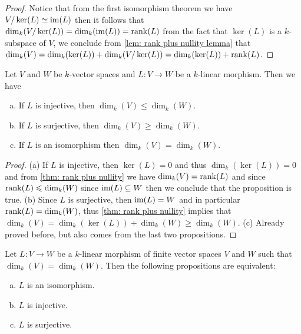 \begin{proof}
    Notice that from the first isomorphism theorem we have \(V/\ker(L) \simeq
    \operatorname{im}(L)\) then it follows that \(\dim_k(V/\ker(L)) = \dim_k(\operatorname{im}(L)) =
    \operatorname{rank}(L)\) from the fact that \(\ker(L)\) is a \(k\)-subspace of \(V\), we
    conclude from \cref{lem: rank plus nullity lemma} that \(\dim_k(V) =
    \dim_k(\ker(L)) + \dim_k(V/\ker(L)) = \dim_k(\ker(L)) + \operatorname{rank}(L)\).
\end{proof}

\begin{corollary}
    Let \(V\) and \(W\) be \(k\)-vector spaces and \(L : V \to W\) be a
    \(k\)-linear morphism. Then we have
    \begin{enumerate}[(a).]
        \item If \(L\) is injective, then \(\dim_k(V) \leq \dim_k(W)\).
        \item If \(L\) is surjective, then \(\dim_k(V) \geq \dim_k(W)\).
        \item If \(L\) is an isomorphism then \(\dim_k(V) = \dim_k(W)\).
    \end{enumerate}
\end{corollary}

\begin{proof}
    (a) If \(L\) is injective, then \(\ker(L) = 0\) and thus \(\dim_k(\ker(L)) =
    0\) and from \cref{thm: rank plus nullity} we have \(\dim_k(V) = \operatorname{rank}(L)\) and
    since \(\operatorname{rank}(L) \leqslant \dim_k(W)\) since \(\operatorname{im}(L) \subseteq W\) then we
    conclude that the proposition is true. (b) Since \(L\) is surjective, then
    \(\operatorname{im}(L) = W\) and in particular \(\operatorname{rank}(L) = \dim_k(W)\), thus \cref{thm: rank
        plus nullity} implies that  \(\dim_k(V) = \dim_k(\ker(L)) + \dim_k(W) \geq
    \dim_k(W)\). (c) Already proved before, but also comes from the last two
    propositions.
\end{proof}

\begin{corollary}\label{cor: equal dim - iso conditions}
    Let \(L : V \to W\) be a \(k\)-linear morphism of finite vector spaces \(V\)
    and \(W\) such that \(\dim_k(V) = \dim_k(W)\). Then the following propositions
    are equivalent:
    \begin{enumerate}[(a).]
        \item \(L\) is an isomorphism.
        \item \(L\) is injective.
        \item \(L\) is surjective.
    \end{enumerate}
\end{corollary}

